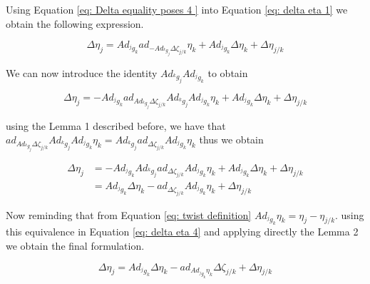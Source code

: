 \documentclass[12pt,a4paper]{book}
\begin{document}
Using Equation \eqref{eq: Delta equality poses 4 } into Equation \eqref{eq: delta eta 1} we obtain the following expression.

\begin{equation}\label{eq: delta eta 2}
	\Delta \eta_j 	= Ad_{^j g_k} ad_{- Ad_{^k g _j}   \Delta \zeta _{j/k}} \eta_k + Ad_{^j g_k} \Delta \eta_k  + \Delta \eta_{j/k}
\end{equation}

We can now introduce the identity $Ad_{^k g _j}Ad_{^j g _k}$ to obtain

\begin{equation}\label{eq: delta eta 3}
	\Delta \eta_j 	= - Ad_{^j g_k} ad_{Ad_{^k g _j}   \Delta \zeta _{j/k}} Ad_{^k g _j}Ad_{^j g _k}  \eta_k + Ad_{^j g_k} \Delta \eta_k  + \Delta \eta_{j/k}
\end{equation}

using the Lemma 1 described before, we have that $ad_{Ad_{^k g _j}   \Delta \zeta _{j/k}} Ad_{^k g _j} Ad_{^j g _k}  \eta_k = Ad_{^k g _j} ad_{\Delta \zeta _{j/k}} Ad_{^j g _k}  \eta_k$ thus we obtain


\begin{equation}\label{eq: delta eta 4}
\begin{aligned}
	\Delta \eta_j 	&= - Ad_{^j g_k} Ad_{^k g _j} ad_{\Delta \zeta _{j/k}} Ad_{^j g _k}  \eta_k + Ad_{^j g_k} \Delta \eta_k  + \Delta \eta_{j/k} \\
					&= Ad_{^j g_k} \Delta \eta_k - ad_{\Delta \zeta _{j/k}} Ad_{^j g _k}  \eta_k +  \Delta \eta_{j/k} 
\end{aligned}
\end{equation}

Now reminding that from Equation \eqref{eq: twist definition} $Ad_{^j g _k}  \eta_k = \eta_j - \eta_{j/k}$. using this equivalence in Equation \eqref{eq: delta eta 4} and applying directly the Lemma 2 we obtain the final formulation.

\begin{equation}\label{eq: delta eta 4}
	\Delta \eta_j 	= Ad_{^j g_k} \Delta \eta_k - ad_{Ad_{^j g _k}  \eta_k} \Delta \zeta _{j/k} +  \Delta \eta_{j/k} 
\end{equation}


\end{document}
